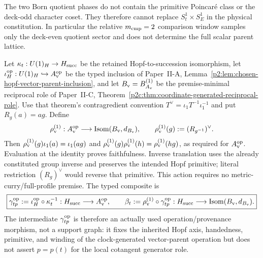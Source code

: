 \documentclass[12pt,a4paper]{article}
\begin{document}
\begin{remark}
\label{p3a:rem:v190-scalar-parent-retention}
The two Born quotient phases do not contain the primitive Poincar\'e class or
the deck-odd character coset.  They therefore cannot replace
$S_t^1\times S_E^1$ in the physical constitution.  In particular the
relative $m_{\rm cmp}=2$ comparison window samples only the deck-even quotient
sector and does not determine the full scalar parent lattice.
\end{remark}

\begin{definition}
\label{p3a:def:clocked-hopf-propagation-doctrine}
\label{p3a:def:full-nonstationary-propagation-occurrence}
Let \(\kappa_t:U(1)_H\to H_{\rm succ}\) be the retained
Hopf-to-succession isomorphism, let
\(\iota_H^{\rm op}:U(1)_H\hookrightarrow A_{\rm v}^{\rm op}\) be the typed
inclusion of Paper~II-A,
Lemma~\ref{p2:lem:chosen-hopf-vector-parent-inclusion}, and let
\(B_{\rm v}=B_{A_{\rm v}}^{(1)}\) be the premise-minimal reciprocal role of
Paper~II-C, Theorem~\ref{p2c:thm:coordinate-generated-reciprocal-role}.
Use that theorem's contragredient convention
\(T^\vee=\iota_1T^{-1}\iota_1^{-1}\) and put \(R_g(a)=ag\). Define
\[
 \rho_{\rm v}^{(1)}:A_{\rm v}^{\rm op}
 \longrightarrow\operatorname{Isom}(B_{\rm v},d_{B_{\rm v}}),
 \qquad \rho_{\rm v}^{(1)}(g):=(R_{g^{-1}})^\vee.
\]
Then \(\rho_{\rm v}^{(1)}(g)\iota_1(a)=\iota_1(ag)\) and
\(\rho_{\rm v}^{(1)}(g)\rho_{\rm v}^{(1)}(h)=
\rho_{\rm v}^{(1)}(hg)\), as required for \(A_{\rm v}^{\rm op}\).
Evaluation at the identity proves faithfulness. Inverse translation uses the
already constituted group inverse and preserves the intended Hopf primitive;
literal restriction \((R_g)^\vee\) would reverse that primitive.
This action requires no metric-curry/full-profile premise.  The typed
composite is
\begin{equation}
\label{p3a:eq:clocked-hopf-composite}
 \boxed{
 \gamma_{tp}^{\rm op}:=\iota_H^{\rm op}\circ\kappa_t^{-1}:
 H_{\rm succ}\longrightarrow A_{\rm v}^{\rm op},\qquad
 \beta_t:=\rho_{\rm v}^{(1)}\circ\gamma_{tp}^{\rm op}:
 H_{\rm succ}\longrightarrow
 \operatorname{Isom}(B_{\rm v},d_{B_{\rm v}}).}
\end{equation}
The intermediate \(\gamma_{tp}^{\rm op}\) is therefore an actually used
operation/provenance morphism, not a support graph: it fixes the inherited
Hopf axis, handedness, primitive, and winding of the clock-generated
vector-parent operation but does not assert \(p=p(t)\) for the local cotangent
generator role.


\end{definition}
\end{document}
